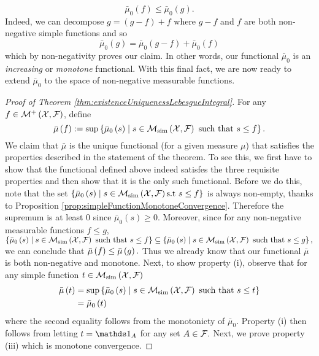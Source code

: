 \[
\bar{\mu}_{0}\left(f\right)\leq\bar{\mu}_{0}\left(g\right).
\]
Indeed, we can decompose $g=\left(g-f\right)+f$ where $g-f$ and
$f$ are both non-negative simple functions and so
\[
\bar{\mu}_{0}\left(g\right)=\bar{\mu}_{0}\left(g-f\right)+\bar{\mu}_{0}\left(f\right)
\]
which by non-negativity proves our claim. In other words, our functional
$\bar{\mu}_{0}$ is an \emph{increasing }or \emph{monotone }functional.
With this final fact, we are now ready to extend $\bar{\mu}_{0}$
to the space of non-negative measurable functions.
\begin{proof}[Proof of Theorem \ref{thm:existenceUniquenessLebesgueIntegral}]
For any $f\in\mathcal{M}^{+}\left(\mathcal{X},\mathcal{F}\right)$, define 
\[
\bar{\mu}\left(f\right):=\sup\left\{ \bar{\mu}_{0}\left(s\right)\mid s\in\mathcal{M}_{\textnormal{sim}}\left(\mathcal{X},\mathcal{F}\right)\textnormal{ such that }s\leq f\right\} .
\]
We claim that $\bar{\mu}$ is the unique functional (for a given measure
$\mu$) that satisfies the properties described in the statement of
the theorem. To see this, we first have to show that the functional
defined above indeed satisfes the three requisite properties and then
show that it is the only such functional. Before we do this, note
that the set $\left\{ \bar{\mu}_{0}\left(s\right)\mid s\in\mathcal{M}_{\textnormal{sim}}\left(\mathcal{X},\mathcal{F}\right)\text{s.t\ }s\leq f\right\} $
is always non-empty, thanks to Proposition \ref{prop:simpleFunctionMonotoneConvergence}.
Therefore the supremum is at least 0 since $\bar{\mu}_{0}\left(s\right)\geq0.$
Moreover, since for any non-negative measurable functions $f\leq g$,
$\left\{ \bar{\mu}_{0}\left(s\right)\mid s\in\mathcal{M}_{\textnormal{sim}}\left(\mathcal{X},\mathcal{F}\right)\textnormal{ such that }s\leq f\right\} \subseteq\left\{ \bar{\mu}_{0}\left(s\right)\mid s\in\mathcal{M}_{\textnormal{sim}}\left(\mathcal{X},\mathcal{F}\right)\textnormal{ such that }s\leq g\right\} ,$we
can conclude that $\bar{\mu}\left(f\right)\leq\bar{\mu}\left(g\right).$ Thus we already
know that our functional $\bar{\mu}$ is both non-negative and monotone.
Next, to show property (i), observe that for any simple function $t\in\mathcal{M}_{\textnormal{sim}}\left(\mathcal{X},\mathcal{F}\right)$
\begin{align*}
\bar{\mu}\left(t\right) & =\sup\left\{ \bar{\mu}_{0}\left(s\right)\mid s\in\mathcal{M}_{\textnormal{sim}}\left(\mathcal{X},\mathcal{F}\right)\textnormal{ such that }s\leq t\right\} \\
 & =\bar{\mu}_{0}\left(t\right)
\end{align*}
where the second equality follows from the monotonicty of $\bar{\mu}_{0}$.
Property (i) then follows from letting $t=\indicate_{A}$ for any
set $A\in\mathcal{F}.$ Next, we prove property (iii) which is monotone convergence.


\end{proof}
